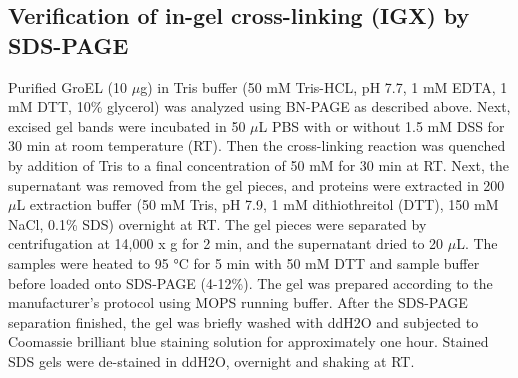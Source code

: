 \subsection*{Verification of in-gel cross-linking (IGX) by SDS-PAGE}
Purified GroEL (10 $\mu$g) in Tris buffer (50 mM Tris-HCL, pH 7.7, 1 mM EDTA, 1 mM DTT, 10\% glycerol) was analyzed using BN-PAGE as described above. Next, excised gel bands were incubated in 50 $\mu$L PBS with or without 1.5 mM DSS for 30 min at room temperature (RT). Then the cross-linking reaction was quenched by addition of Tris to a final concentration of 50 mM for 30 min at RT. Next, the supernatant was removed from the gel pieces, and proteins were extracted in 200 $\mu$L extraction buffer (50 mM Tris, pH 7.9, 1 mM dithiothreitol (DTT), 150 mM NaCl, 0.1\% SDS) overnight at RT. The gel pieces were separated by centrifugation at 14,000 x g for 2 min, and the supernatant dried to 20 $\mu$L. The samples were heated to 95 °C for 5 min with 50 mM DTT and sample buffer before loaded onto SDS-PAGE (4-12\%). The gel was prepared according to the manufacturer's protocol using MOPS running buffer. After the SDS-PAGE separation finished, the gel was briefly washed with ddH2O and subjected to Coomassie brilliant blue staining solution for approximately one hour. Stained SDS gels were de-stained in ddH2O, overnight and shaking at RT. \clearpage
